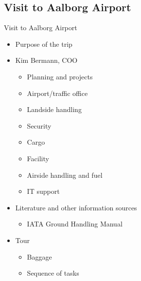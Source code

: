 \subsection{Visit to Aalborg Airport}
\begin{frame}{Visit to Aalborg Airport}{}
	\begin{itemize}
\item Purpose of the trip
\item Kim Bermann, COO
\begin{itemize}
	\item Planning and projects
	\item Airport/traffic office
	\item Landside handling
	\item Security
	\item Cargo
	\item Facility
	\item Airside handling and fuel
	\item IT support
\end{itemize}
\item Literature and other information sources
\begin{itemize}
	\item IATA Ground Handling Manual
\end{itemize}
\item Tour
\begin{itemize}
	\item Baggage 
	\item Sequence of tasks
\end{itemize}
\end{itemize}
\end{frame}
